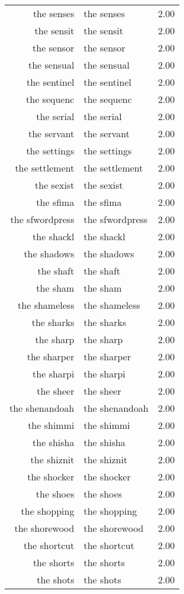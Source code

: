\begin{table}[ht]
\begin{tabular}{rlr}
  the senses & the senses & 2.00 \\ 
  the sensit & the sensit & 2.00 \\ 
  the sensor & the sensor & 2.00 \\ 
  the sensual & the sensual & 2.00 \\ 
  the sentinel & the sentinel & 2.00 \\ 
  the sequenc & the sequenc & 2.00 \\ 
  the serial & the serial & 2.00 \\ 
  the servant & the servant & 2.00 \\ 
  the settings & the settings & 2.00 \\ 
  the settlement & the settlement & 2.00 \\ 
  the sexist & the sexist & 2.00 \\ 
  the sfima & the sfima & 2.00 \\ 
  the sfwordpress & the sfwordpress & 2.00 \\ 
  the shackl & the shackl & 2.00 \\ 
  the shadows & the shadows & 2.00 \\ 
  the shaft & the shaft & 2.00 \\ 
  the sham & the sham & 2.00 \\ 
  the shameless & the shameless & 2.00 \\ 
  the sharks & the sharks & 2.00 \\ 
  the sharp & the sharp & 2.00 \\ 
  the sharper & the sharper & 2.00 \\ 
  the sharpi & the sharpi & 2.00 \\ 
  the sheer & the sheer & 2.00 \\ 
  the shenandoah & the shenandoah & 2.00 \\ 
  the shimmi & the shimmi & 2.00 \\ 
  the shisha & the shisha & 2.00 \\ 
  the shiznit & the shiznit & 2.00 \\ 
  the shocker & the shocker & 2.00 \\ 
  the shoes & the shoes & 2.00 \\ 
  the shopping & the shopping & 2.00 \\ 
  the shorewood & the shorewood & 2.00 \\ 
  the shortcut & the shortcut & 2.00 \\ 
  the shorts & the shorts & 2.00 \\ 
  the shots & the shots & 2.00 \\ 

\end{tabular}
\end{table}
